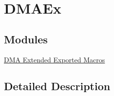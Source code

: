 \hypertarget{group___d_m_a_ex}{}\section{D\+M\+A\+Ex}
\label{group___d_m_a_ex}
\subsection*{Modules}
\begin{DoxyCompactItemize}
\item 
\hyperlink{group___d_m_a_ex___exported___macros}{D\+M\+A Extended Exported Macros}
\end{DoxyCompactItemize}


\subsection{Detailed Description}
